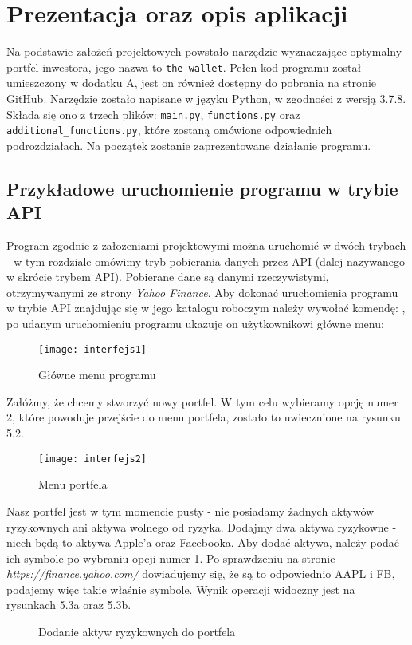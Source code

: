 \documentclass[magister]{dyplom}
\def\code#1{\texttt{#1}}
\begin{document}
\chapter{Prezentacja oraz opis aplikacji}

Na podstawie założeń projektowych powstało narzędzie wyznaczające optymalny portfel inwestora, jego nazwa to \code{the-wallet}. Pełen kod programu został umieszczony w dodatku A, jest on również dostępny do pobrania na stronie GitHub. Narzędzie zostało napisane w języku Python, w zgodności z wersją 3.7.8. Składa się ono z trzech plików: \code{main.py}, \code{functions.py} oraz \code{additional\_functions.py}, które zostaną omówione odpowiednich podrozdziałach. Na początek zostanie zaprezentowane działanie programu.

\section{Przykładowe uruchomienie programu w trybie API}

Program zgodnie z założeniami projektowymi można uruchomić w dwóch trybach - w tym rozdziale omówimy tryb pobierania danych przez API (dalej nazywanego w skrócie trybem API). Pobierane dane są danymi rzeczywistymi, otrzymywanymi ze strony \textit{Yahoo Finance}. Aby dokonać uruchomienia programu w trybie API znajdując się w jego katalogu roboczym należy wywołać komendę:
, po udanym uruchomieniu programu ukazuje on użytkownikowi główne menu:

\begin{figure}[ht]
	\centering
	\texttt{[image: interfejs1]}
	\caption{Główne menu programu}
\end{figure}
Załóżmy, że chcemy stworzyć nowy portfel. W tym celu wybieramy opcję numer 2, które powoduje przejście do menu portfela, zostało to uwiecznione na rysunku 5.2.

\begin{figure}[ht]
	\centering
	\texttt{[image: interfejs2]}
	\caption{Menu portfela}
\end{figure}
Nasz portfel jest w tym momencie pusty - nie posiadamy żadnych aktywów ryzykownych ani aktywa wolnego od ryzyka. Dodajmy dwa aktywa ryzykowne - niech będą to aktywa Apple'a oraz Facebooka. Aby dodać aktywa, należy podać ich symbole po wybraniu opcji numer 1. Po sprawdzeniu na stronie \textit{https://finance.yahoo.com/} dowiadujemy się, że są to odpowiednio AAPL i FB, podajemy więc takie właśnie symbole. Wynik operacji widoczny jest na rysunkach 5.3a oraz 5.3b.
\newpage
\begin{figure}
	\centering
	\quad
	\caption{Dodanie aktyw ryzykownych do portfela}
\end{figure}
\end{document}
